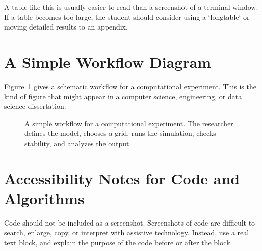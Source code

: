 A table like this is usually easier to read than a screenshot of a terminal window. If a table becomes too large, the student should consider using a `longtable` or moving detailed results to an appendix.

\section{A Simple Workflow Diagram}
\label{sec:workflow-diagram}

Figure~\ref{fig:computational-workflow} gives a schematic workflow for a computational experiment. This is the kind of figure that might appear in a computer science, engineering, or data science dissertation.

\begin{figure}[htbp]
\centering
{}
\caption{A simple workflow for a computational experiment. The researcher defines the model, chooses a grid, runs the simulation, checks stability, and analyzes the output.}
\label{fig:computational-workflow}
\end{figure}

\section{Accessibility Notes for Code and Algorithms}
\label{sec:code-accessibility-notes}

Code should not be included as a screenshot. Screenshots of code are difficult to search, enlarge, copy, or interpret with assistive technology. Instead, use a real text block, and explain the purpose of the code before or after the block.

